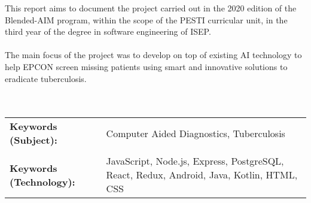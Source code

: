 This report aims to document the project carried out in the 2020 edition of the Blended-AIM program, within the scope of the PESTI curricular unit, in the third year of the degree in software engineering of ISEP.
\\ \\
The main focus of the project was to develop on top of existing AI technology to help EPCON screen missing patients using smart and innovative solutions to eradicate tuberculosis.
\\ \\ \\

\begin{tabular}{>{\raggedright\arraybackslash}p{6.3cm}p{8cm}}
	\textbf{Keywords (Subject):}	
	& Computer Aided Diagnostics, Tuberculosis
	\\ \\
	\textbf{Keywords (Technology):}
	& 	JavaScript, Node.js, Express, PostgreSQL, React, Redux, Android, Java, Kotlin, HTML, CSS \\ 
\end{tabular} 






